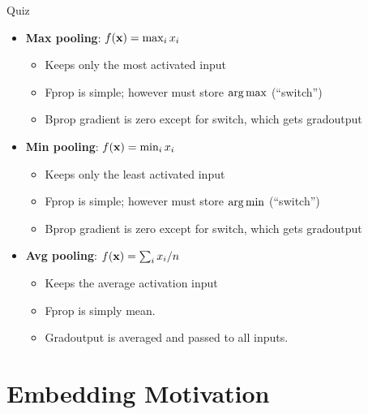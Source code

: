 \documentclass{beamer}
\begin{document}
\begin{frame}{Quiz}
  \begin{itemize}
  \item \textbf{Max pooling}:  $f(\mathbf{x}) = \max_{i} x_i$

    \begin{itemize}
    \item Keeps only the most activated input
    \item Fprop is simple; however must store $\argmax$ (``switch'')
    \item Bprop gradient is zero except for switch, which gets gradoutput
    \end{itemize}
    \pause

  \item \textbf{Min pooling}: $ f(\mathbf{x}) = \min_{i} x_i $
    \begin{itemize}
    \item Keeps only the least activated input
    \item Fprop is simple; however must store $\argmin$ (``switch'')
    \item Bprop gradient is zero except for switch, which gets gradoutput
    \end{itemize}
    \pause

  \item \textbf{Avg pooling}: $ f(\mathbf{x}) = \sum_i x_i / n $
    \begin{itemize}
    \item Keeps the average activation input
    \item Fprop is simply mean.
    \item Gradoutput is averaged and passed to all inputs.
    \end{itemize}
  \end{itemize}
\end{frame}

\section{Embedding Motivation}
\end{document}
